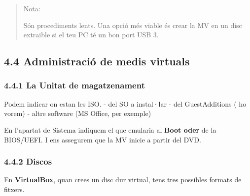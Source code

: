 \documentclass[
  12 pt,
  a4paper,
]{article}
\begin{document}
\begin{quote}
Nota:

Són procediments lents. Una opció més viable és crear la MV en un disc
extraible si el teu PC té un bon port USB 3.
\end{quote}

\subsection{4.4 Administració de medis
virtuals}\label{administraciuxf3-de-medis-virtuals}

\subsubsection{4.4.1 La Unitat de
magatzenament}\label{la-unitat-de-magatzenament}

Podem indicar on estan les ISO. - del SO a instal·lar - del
GuestAdditions ( ho vorem) - altre software (MS Office, per exemple)

En l'apartat de Sistema indiquem el que emularia al \textbf{Boot oder}
de la BIOS/UEFI. I ens assegurem que la MV inicie a partir del DVD.

\subsubsection{4.4.2 Discos}\label{discos}

En \textbf{VirtualBox}, quan crees un disc dur virtual, tens tres
possibles formats de fitxers.
\end{document}
